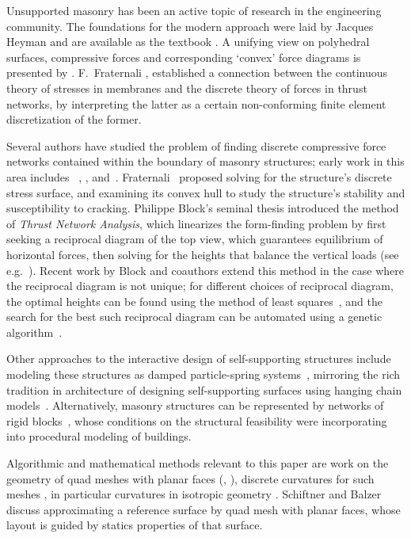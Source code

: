 \documentclass[annual]{acmsiggraph}
\begin{document}
Unsupported masonry has been an active topic of research in the 
engineering community. The foundations for the modern approach were laid 
by Jacques Heyman  and are available as the textbook 
\cite{Heyman95}. A unifying view on polyhedral surfaces, compressive 
forces and corresponding `convex' force diagrams is presented by 
\cite{Ash1988}. F.~Fraternali , 
 established a connection between the continuous 
theory of stresses in membranes and the discrete theory of forces in 
thrust networks, by interpreting the latter as a certain non-conforming finite 
element discretization of the former.

Several authors have studied the problem of finding discrete compressive 
force networks contained within the boundary of masonry structures; early 
work in this area includes \ \cite{schek74}, \cite{Livesley92}, and\ 
\cite{O'Dwyer98}. Fraternali~ proposed solving 
for the structure's discrete stress surface, and examining its convex hull 
to study the structure's stability and susceptibility to cracking. 
Philippe Block's seminal thesis introduced the method 
of {\it Thrust Network Analysis}, which linearizes the form-finding problem by 
first seeking a reciprocal diagram of the top view, which guarantees 
equilibrium of horizontal forces, then solving for the heights that 
balance the vertical loads (see e.g.\ \cite{Block07,block09}). Recent work by Block and coauthors extend this 
method in the case where the reciprocal diagram is not unique; for 
different choices of reciprocal diagram, the optimal heights can be found 
using the method of least squares~\cite{vanmele2011}, and the search for 
the best such reciprocal diagram can be automated using a genetic 
algorithm~\cite{Block2011}.

Other approaches to the interactive design of self-supporting structures 
include modeling these structures as damped particle-spring 
systems~\cite{Kilian2005,barnes09}, mirroring the rich tradition in architecture of 
designing self-supporting surfaces using hanging chain 
models~\cite{Heyman98}. Alternatively, masonry structures can be 
represented by networks of rigid blocks~\cite{Whiting09}, whose conditions 
on the structural feasibility were incorporating into procedural modeling 
of buildings.

Algorithmic and mathematical methods relevant to this paper are work on 
the geometry of quad meshes with planar faces (\cite{Glymph2004}, 
\cite{Liu2006}), discrete curvatures for such meshes \cite{Pottmann2007b}, 
in particular curvatures in isotropic geometry \cite{Pottmann2007}. 
Schiftner and Balzer \shortcite{Schiftner2010} discuss approximating a 
reference surface by quad mesh with planar faces, whose layout is guided 
by statics properties of that surface.
\end{document}
